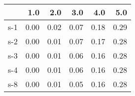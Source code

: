 \begin{tabular}{lrrrrr}
\toprule
{} &  1.0 &  2.0 &  3.0 &  4.0 &  5.0 \\
\midrule
s-1 & 0.00 & 0.02 & 0.07 & 0.18 & 0.29 \\
s-2 & 0.00 & 0.01 & 0.07 & 0.17 & 0.28 \\
s-3 & 0.00 & 0.01 & 0.06 & 0.16 & 0.28 \\
s-4 & 0.00 & 0.01 & 0.06 & 0.16 & 0.28 \\
s-8 & 0.00 & 0.01 & 0.05 & 0.16 & 0.28 \\
\bottomrule
\end{tabular}
